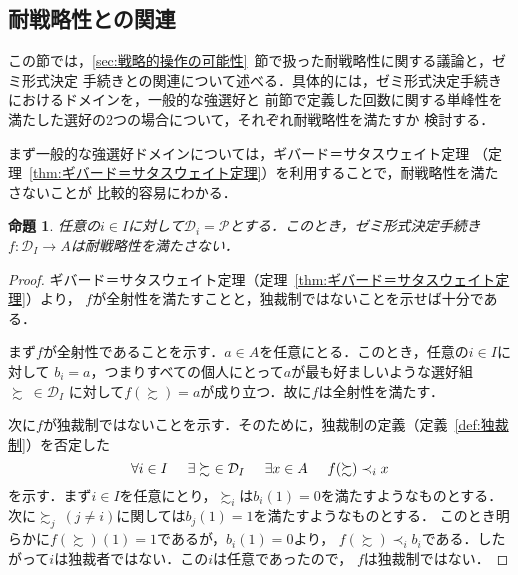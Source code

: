 \documentclass[dvipdfmx]{jsarticle}
\newtheorem{proposition}[definition]{命題}
\begin{document}
\subsection{耐戦略性との関連}\label{subsec:耐戦略性との関連}
  この節では，\ref{sec:戦略的操作の可能性}~節で扱った耐戦略性に関する議論と，ゼミ形式決定
  手続きとの関連について述べる．具体的には，ゼミ形式決定手続きにおけるドメインを，一般的な強選好と
  前節で定義した回数に関する単峰性を満たした選好の2つの場合について，それぞれ耐戦略性を満たすか
  検討する．

  まず一般的な強選好ドメインについては，ギバード＝サタスウェイト定理
  （定理~\ref{thm:ギバード＝サタスウェイト定理}）を利用することで，耐戦略性を満たさないことが
  比較的容易にわかる．

  \begin{proposition}
    任意の$i \in I$に対して$\mathcal{D}_i = \mathcal{P}$とする．このとき，ゼミ形式決定手続き
    $f\colon \mathcal{D}_I \to A$は耐戦略性を満たさない．
  \end{proposition}
    
  \begin{proof}
    ギバード＝サタスウェイト定理（定理~\ref{thm:ギバード＝サタスウェイト定理}）より，
    $f$が全射性を満たすことと，独裁制ではないことを示せば十分である．

    まず$f$が全射性であることを示す．$a \in A$を任意にとる．このとき，任意の$i \in I$に対して
    $b_i = a$，つまりすべての個人にとって$a$が最も好ましいような選好組$\succsim \ \in \mathcal{D}_I$
    に対して$f(\succsim) = a$が成り立つ．故に$f$は全射性を満たす．

    次に$f$が独裁制ではないことを示す．そのために，独裁制の定義（定義~\ref{def:独裁制}）を否定した
    \begin{equation*}
      \forall i \in I \hspace{5mm} \exists \succsim \ \in \mathcal{D}_I \hspace{5mm} 
      \exists x \in A \hspace{5mm} f(\succsim) \prec_i x
    \end{equation*}
    を示す．まず$i \in I$を任意にとり，$\succsim_i$は$b_i(1)=0$を満たすようなものとする．
    次に$\succsim_j\ (j \neq i)$に関しては$b_j(1) = 1$を満たすようなものとする．
    このとき明らかに$f(\succsim)(1) = 1$であるが，$b_i(1)=0$より，
    $f(\succsim) \prec_i b_i$である．したがって$i$は独裁者ではない．この$i$は任意であったので，
    $f$は独裁制ではない．
  \end{proof}
\end{document}
